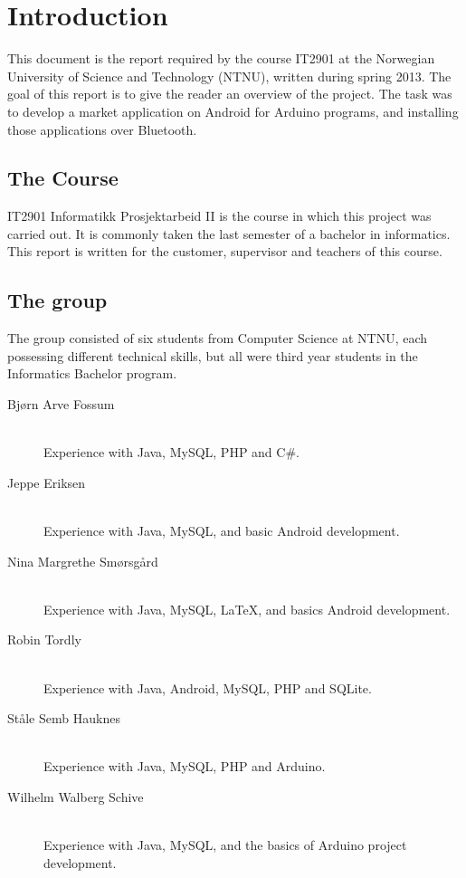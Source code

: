 \chapter{Introduction}

This document is the report required by the course IT2901 at the Norwegian University of Science and Technology (NTNU), written during spring 2013. The goal of this report is to give the reader an overview of the project.
The task was to develop a market application on Android for Arduino programs, and installing those applications over Bluetooth.

\section{The Course}
IT2901 Informatikk Prosjektarbeid II is the course in which this project was carried out. It is commonly taken the last semester of a bachelor in informatics. This report is written for the customer, supervisor and teachers of this course.

\section{The group}
The group consisted of six students from Computer Science at NTNU, each possessing different technical skills, but all were third year students in the Informatics Bachelor program.

\begin{description}
	\item[Bjørn Arve Fossum]\hfill \\
		Experience with Java, MySQL, PHP and C\#.
	\item[Jeppe Eriksen]\hfill \\
		Experience with Java, MySQL, and basic Android development.
	\item[Nina Margrethe Smørsgård]\hfill \\
		Experience with Java, MySQL, \LaTeX, and basics Android development.
	\item[Robin Tordly]\hfill \\
		Experience with Java, Android, MySQL, PHP and SQLite.
	\item[Ståle Semb Hauknes]\hfill \\
		Experience with Java, MySQL, PHP and Arduino.
	\item[Wilhelm Walberg Schive]\hfill \\
		Experience with Java, MySQL, and the basics of Arduino project development.
\end{description}


